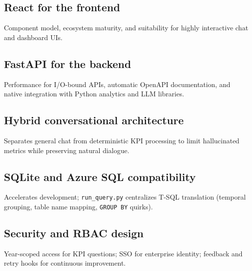 \subsection{React for the frontend}
Component model, ecosystem maturity, and suitability for highly interactive chat and dashboard UIs.

\subsection{FastAPI for the backend}
Performance for I/O-bound APIs, automatic OpenAPI documentation, and native integration with Python analytics and LLM libraries.

\subsection{Hybrid conversational architecture}
Separates general chat from deterministic KPI processing to limit hallucinated metrics while preserving natural dialogue.

\subsection{SQLite and Azure SQL compatibility}
Accelerates development; \texttt{run\_query.py} centralizes T-SQL translation (temporal grouping, table name mapping, \texttt{GROUP BY} quirks).

\subsection{Security and RBAC design}
Year-scoped access for KPI questions; SSO for enterprise identity; feedback and retry hooks for continuous improvement.
